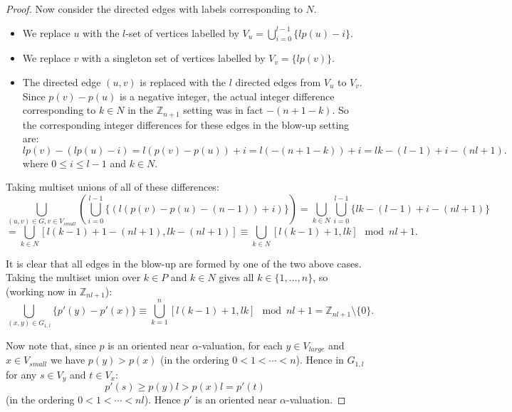 \documentclass[12pt, a4paper]{article}
\theoremstyle{definition}
\begin{document}
\begin{proof}
Now consider the directed edges with labels corresponding to $N$. 
\begin{itemize}
\item We replace $u$ with the $l$-set of vertices labelled by $V_u=\bigcup_{i=0}^{l-1}\{lp(u)-i\}$.
\item We replace $v$ with a singleton set of vertices labelled by $V_v = \{lp(v)\}$.
\item The directed edge $(u,v)$ is replaced with the $l$ directed edges from $V_u$ to $V_v$.  Since $p(v)-p(u)$ is a negative integer, the actual integer difference corresponding to $k \in N$ in the $\mathbb{Z}_{n+1}$ setting was in fact $-(n+1-k)$.  So the corresponding integer differences for these edges in the blow-up setting are:
\[lp(v)-(lp(u)-i)=l(p(v)-p(u))+i = l(-(n+1-k))+i=lk-(l-1)+i-(nl+1).\]
where $0 \leq i \leq l-1$ and $k \in N$.  
\end{itemize}
Taking multiset unions of all of these differences:
\[
\bigcup_{(u,v) \in G, v \in V_{small}} \left( \bigcup_{i=0}^{l-1} \{ (l(p(v)-p(u)-(n-1))+i) \} \right)
= \bigcup_{k\in N} \bigcup_{i=0}^{l-1} \{ lk-(l-1)+i-(nl+1) \}\]
\[= \bigcup_{k \in N}[l(k-1)+1-(nl+1),lk-(nl+1)] \equiv \bigcup_{k \in N}[l(k-1)+1,lk]\mod nl+1. \]

It is clear that all edges in the blow-up are formed by one of the two above cases. Taking the multiset union over $k \in P$ and $k \in N$ gives all $k \in \{1, \ldots ,n \}$, so (working now in $\mathbb{Z}_{nl+1}$):
\[\bigcup_{(x,y) \in G_{1,l}} \{p'(y)-p'(x)\} \equiv \bigcup_{k=1}^n[l(k-1)+1,lk] \mod nl+1 = \mathbb{Z}_{nl+1} \setminus \{0\}.\]

Now note that, since $p$ is an oriented near $\alpha$-valuation, for each $ y \in V_{large}$ and $x \in V_{small}$ we have $p(y) > p(x)$ (in the ordering $0<1< \cdots < n$). Hence in $G_{1,l}$ for any $s \in V_y$ and $t \in V_x$:
    \[p'(s) \geq p(y)l >   p(x)l = p'(t)\]
(in the ordering $0<1< \cdots< nl$).
Hence $p'$ is an oriented near $\alpha$-valuation.
\end{proof} 
\end{document}
